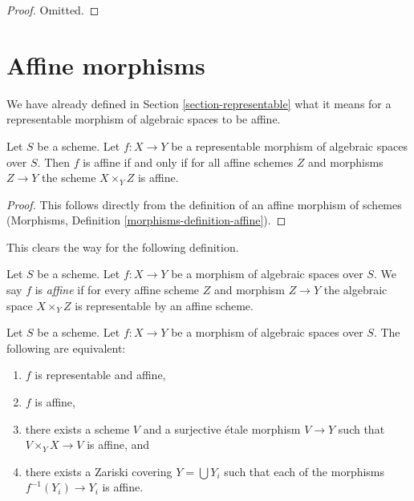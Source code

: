 \begin{proof}
Omitted.
\end{proof}











\section{Affine morphisms}
\label{section-affine}

\noindent
We have already defined in Section \ref{section-representable}
what it means for a representable morphism of algebraic spaces
to be affine.

\begin{lemma}
\label{lemma-affine-representable}
Let $S$ be a scheme. Let $f : X \to Y$ be a representable
morphism of algebraic spaces over $S$. Then
$f$ is affine if and only if for all affine schemes $Z$
and morphisms $Z \to Y$ the scheme $X \times_Y Z$ is affine.
\end{lemma}

\begin{proof}
This follows directly from the definition of an affine morphism of schemes
(Morphisms, Definition \ref{morphisms-definition-affine}).
\end{proof}

\noindent
This clears the way for the following definition.

\begin{definition}
\label{definition-affine}
Let $S$ be a scheme.
Let $f : X \to Y$ be a morphism of algebraic spaces over $S$.
We say $f$ is {\it affine} if for every affine scheme $Z$ and
morphism $Z \to Y$ the algebraic space $X \times_Y Z$ is representable
by an affine scheme.
\end{definition}

\begin{lemma}
\label{lemma-affine-local}
Let $S$ be a scheme.
Let $f : X \to Y$ be a morphism of algebraic spaces over $S$.
The following are equivalent:
\begin{enumerate}
\item $f$ is representable and affine,
\item $f$ is affine,
\item there exists a scheme $V$ and a surjective \'etale morphism
$V \to Y$ such that $V \times_Y X \to V$ is affine, and
\item there exists a Zariski covering $Y = \bigcup Y_i$ such
that each of the morphisms $f^{-1}(Y_i) \to Y_i$ is affine.
\end{enumerate}
\end{lemma}

